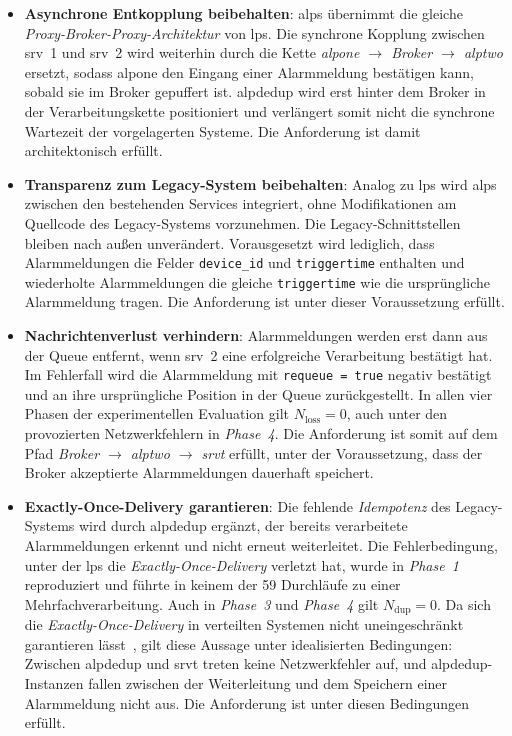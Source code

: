 \begin{itemize}
    \item \textbf{Asynchrone Entkopplung beibehalten}: \gls{alps} übernimmt die gleiche \textit{Proxy-Broker-Proxy-Architektur} von \gls{lps}. Die synchrone Kopplung zwischen \gls{srv}~1 und \gls{srv}~2 wird weiterhin durch die Kette \textit{\gls{alpone} $\rightarrow$ Broker $\rightarrow$ \gls{alptwo}} ersetzt, sodass \gls{alpone} den Eingang einer Alarmmeldung bestätigen kann, sobald sie im Broker gepuffert ist. \gls{alpdedup} wird erst hinter dem Broker in der Verarbeitungskette positioniert und verlängert somit nicht die synchrone Wartezeit der vorgelagerten Systeme. Die Anforderung ist damit architektonisch erfüllt.

    \item \textbf{Transparenz zum Legacy-System beibehalten}: Analog zu \gls{lps} wird \gls{alps} zwischen den bestehenden Services integriert, ohne Modifikationen am Quellcode des Legacy-Systems vorzunehmen. Die Legacy-Schnittstel\-len bleiben nach außen unverändert. Vorausgesetzt wird lediglich, dass Alarmmeldungen die Felder \texttt{device\_id} und \texttt{triggertime} enthalten und wiederholte Alarmmeldungen die gleiche \texttt{triggertime} wie die ursprüng\-li\-che Alarmmeldung tragen. Die Anforderung ist unter dieser Voraussetzung erfüllt.

    \item \textbf{Nachrichtenverlust verhindern}: Alarmmeldungen werden erst dann aus der Queue entfernt, wenn \gls{srv}~2 eine erfolgreiche Verarbeitung bestä\-tigt hat. Im Fehlerfall wird die Alarmmeldung mit \texttt{requeue = true} negativ bestätigt und an ihre ursprüngliche Position in der Queue zurückge\-stellt. In allen vier Phasen der experimentellen Evaluation gilt $N_{\text{loss}} = 0$, auch unter den provozierten Netzwerkfehlern in \textit{Phase~4}. Die Anforderung ist somit auf dem Pfad \textit{Broker $\rightarrow$ \gls{alptwo} $\rightarrow$ \gls{srvt}} erfüllt, unter der Voraussetzung, dass der Broker akzeptierte Alarmmeldungen dauerhaft speichert.

          \newpage

    \item \textbf{Exactly-Once-Delivery garantieren}: Die fehlende \textit{Idempotenz} des Legacy-Systems wird durch \gls{alpdedup} ergänzt, der bereits verarbeitete Alarmmeldungen er\-kennt und nicht erneut weiterleitet. Die Fehlerbedingung, unter der \gls{lps} die \textit{Exactly-Once-Delivery} verletzt hat, wurde in \textit{Phase~1} reproduziert und führte in keinem der 59 Durchläufe zu einer Mehrfachverarbeitung. Auch in \textit{Phase~3} und \textit{Phase~4} gilt $N_{\text{dup}} = 0$. Da sich die \textit{Exactly-Once-Delivery} in verteilten Systemen nicht uneingeschränkt garantieren lässt~\citep{akkoyunlu1975}, gilt diese Aussage unter idealisierten Bedingungen: Zwischen \gls{alpdedup} und \gls{srvt} treten keine Netzwerkfehler auf, und \gls{alpdedup}-Instanzen fallen zwischen der Weiterleitung und dem Speichern einer Alarmmeldung nicht aus. Die Anforderung ist unter diesen Bedingungen erfüllt.


\end{itemize}
